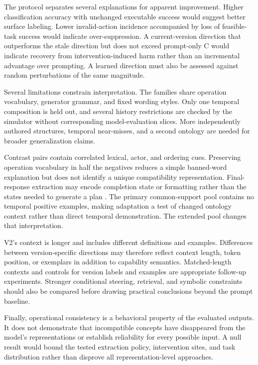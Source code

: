 \documentclass[preprint,12pt,numbers,nopreprintline]{elsarticle}
\begin{document}
The protocol separates several explanations for apparent improvement. Higher classification accuracy with unchanged executable success would suggest better surface labeling. Lower invalid-action incidence accompanied by loss of feasible-task success would indicate over-suppression. A current-version direction that outperforms the stale direction but does not exceed prompt-only C would indicate recovery from intervention-induced harm rather than an incremental advantage over prompting. A learned direction must also be assessed against random perturbations of the same magnitude.

Several limitations constrain interpretation. The families share operation vocabulary, generator grammar, and fixed wording styles. Only one temporal composition is held out, and several history restrictions are checked by the simulator without corresponding model-evaluation slices. More independently authored structures, temporal near-misses, and a second ontology are needed for broader generalization claims.

Contrast pairs contain correlated lexical, actor, and ordering cues. Preserving operation vocabulary in half the negatives reduces a simple banned-word explanation but does not identify a unique compatibility representation. Final-response extraction may encode completion state or formatting rather than the states needed to generate a plan \citep{ref15,ref16}. The primary common-support pool contains no temporal positive examples, making adaptation a test of changed ontology context rather than direct temporal demonstration. The extended pool changes that interpretation.

V2's context is longer and includes different definitions and examples. Differences between version-specific directions may therefore reflect context length, token position, or exemplars in addition to capability semantics. Matched-length contexts and controls for version labels and examples are appropriate follow-up experiments. Stronger conditional steering, retrieval, and symbolic constraints should also be compared before drawing practical conclusions beyond the prompt baseline.

Finally, operational consistency is a behavioral property of the evaluated outputs. It does not demonstrate that incompatible concepts have disappeared from the model's representations or establish reliability for every possible input. A null result would bound the tested extraction policy, intervention sites, and task distribution rather than disprove all representation-level approaches.
\end{document}
